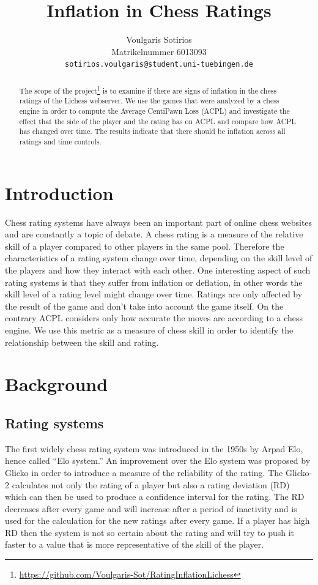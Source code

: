 \documentclass{article}
\title{Inflation in Chess Ratings}
\author{%
  Voulgaris Sotirios\\
  Matrikelnummer 6013093\\
  \texttt{sotirios.voulgaris@student.uni-tuebingen.de} \\
}
\begin{document}
\maketitle

\begin{abstract}
The scope of the project\footnote{\url{https://github.com/Voulgaris-Sot/RatingInflationLichess}} is to examine if there are signs of inflation in the chess ratings of the Lichess webserver. We use the games that were analyzed by a chess engine in order to compute the Average CentiPawn Loss (ACPL) and investigate the effect that the side of the player and the rating has on ACPL and compare how ACPL has changed over time. The results indicate that there should be inflation across all ratings and time controls.
\end{abstract}

\section{Introduction}

Chess rating systems have always been an important part of online chess websites and are constantly a topic of debate. A chess rating is a measure of the relative skill of a player compared to other players in the same pool. Therefore the characteristics of a rating system change over time, depending on the skill level of the players and how they interact with each other. One interesting aspect of such rating systems is that they suffer from inflation or deflation, in other words the skill level of a rating level might change over time. Ratings are only affected by the result of the game and don’t take into account the game itself. On the contrary ACPL considers only how accurate the moves are according to a chess engine. We use this metric as a measure of chess skill in order to identify the relationship between the skill and rating.

\section{Background}

\subsection{Rating systems}

The first widely chess rating system was introduced in the 1950s by Arpad Elo, hence called “Elo system.” An improvement over the Elo system was proposed by Glicko in order to introduce a measure of the reliability of the rating. The Glicko-2 \cite{glicko2} calculates not only the rating of a player but also a rating deviation (RD) which can then be used to produce a confidence interval for the rating. The RD decreases after every game and will increase after a period of inactivity and is used for the calculation for the new ratings after every game. If a player has high RD then the system is not so certain about the rating and will try to push it faster to a value that is more representative of the skill of the player. 
\end{document}

